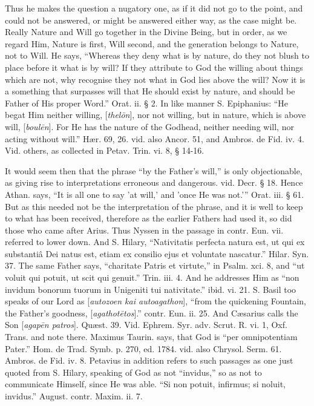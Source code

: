 Thus he makes the question a nugatory one, as if
it did not go to the point, and could not be answered, or might be
answered either way, as the case might be. Really Nature and Will go
together in the Divine Being, but in order, as we regard Him, Nature
is first, Will second, and the generation belongs to Nature, not to
Will. He says, “Whereas they deny what is by nature, do they not
blush to place before it what is by will? If they attribute to God the
willing about things which are not, why recognise they not what in God
lies above the will? Now it is a something that surpasses will that He
should exist by nature, and should be Father of His proper Word.”
Orat. ii. § 2. In like manner S. Epiphanius: “He begat Him neither
willing, [\emph{thel\={o}n}], nor not willing, but in nature, which
is above will, [\emph{boul\={e}n}]. For He has the nature of the
Godhead, neither needing will, nor acting without will.” Hær.
69, 26. vid. also Ancor. 51, and Ambros. de Fid. iv. 4. Vid. others,
as collected in Petav. Trin. vi. 8, § 14-16.

It would seem then that the phrase “by the
Father’s will,” is only objectionable, as giving rise to
interpretations erroneous and dangerous. vid. Decr. § 18. Hence Athan.
says, “It is all one to say 'at will,' and 'once He was not.'”
Orat. iii. § 61. But as this needed not be the interpretation of the
phrase, and it is well to keep to what has been received, therefore as
the earlier Fathers had used it, so did those who came after Arius.
Thus Nyssen in the passage in contr. Eun. vii. referred to lower down.
And S. Hilary, “Nativitatis perfecta natura est, ut qui ex substantiâ
Dei natus est, etiam ex consilio ejus et voluntate nascatur.” Hilar.
Syn. 37. The same Father says, “charitate Patris et virtute,” in
Psalm. xci. 8, and “ut voluit qui potuit, ut scit qui genuit.”
Trin. iii. 4. And he addresses Him as “non invidum bonorum tuorum in
Unigeniti tui nativitate.” ibid. vi. 21. S. Basil too speaks of our
Lord as [\emph{autozoen kai autoagathon}], “from the
quickening Fountain, the Father’s goodness, [\emph{agathot\={e}tos}].”
contr. Eun. ii. 25. And Cæsarius calls the Son [\emph{agap\={e}n
patros}]. Quæst. 39. Vid. Ephrem. Syr. adv. Scrut. R. vi. 1, Oxf.
Trans. and note there. Maximus Taurin. says, that God is “per
omnipotentiam Pater.” Hom. de Trad. Symb. p. 270, ed. 1784. vid.
also Chrysol. Serm. 61. Ambros. de Fid. iv. 8. Petavius in addition
refers to such passages as one just quoted from S. Hilary, speaking of
God as not “invidus,” so as not to communicate Himself, since He
was able. “Si non potuit, infirmus; si noluit, invidus.”
August. contr. Maxim. ii. 7.

